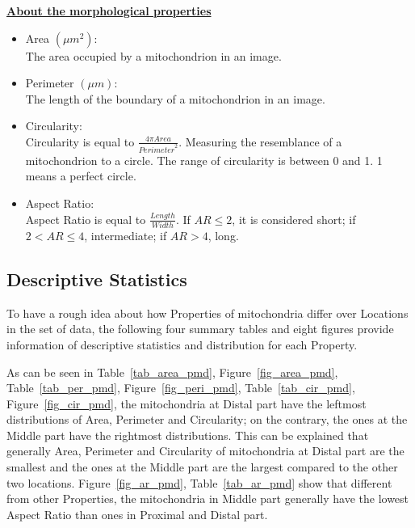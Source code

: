 \documentclass{article}\usepackage[]{graphicx}\usepackage[]{color}
\numberwithin{figure}{subsection} %
\numberwithin{table}{subsection} %
\begin{document}
\noindent\textbf{\underline{About the morphological properties}}
\begin{itemize}
  \item Area $({\mu m}^{2})$: \\
  The area occupied by a mitochondrion in an image. 
  \item Perimeter $(\mu m)$: \\
  The length of the boundary of a mitochondrion in an image. 
  \item Circularity: \\
  Circularity is equal to $\frac{4\pi Area}{{Perimeter}^{2}}$. Measuring the     resemblance of a mitochondrion to a circle. The range of circularity is     between 0 and 1.  1 means a perfect circle. 
  \item Aspect Ratio: \\
  Aspect Ratio is equal to $\frac{Length}{Width}$. If $AR\leq 2$, it is considered short; if $2<AR\leq 4$, intermediate; if $AR>4$, long.  
\end{itemize}

\setlength{\parskip}{2em}
\subsection{Descriptive Statistics}
To have a rough idea about how Properties of mitochondria differ over Locations in the set of data, the following four summary tables and eight figures provide information of descriptive statistics and distribution for each Property. 

As can be seen in Table~\ref{tab_area_pmd}, Figure~\ref{fig_area_pmd}, Table~\ref{tab_per_pmd}, Figure~\ref{fig_peri_pmd}, Table~\ref{tab_cir_pmd}, Figure~\ref{fig_cir_pmd}, the mitochondria at Distal part have the leftmost distributions of Area, Perimeter and Circularity; on the contrary, the ones at the Middle part have the rightmost distributions. This can be explained that generally Area, Perimeter and Circularity of mitochondria at Distal part are the smallest and the ones at the Middle part are the largest compared to the other two locations. Figure~\ref{fig_ar_pmd},  Table~\ref{tab_ar_pmd} show that different from other Properties, the mitochondria in Middle part generally have the lowest Aspect Ratio than ones in Proximal and Distal part. 
\end{document}
